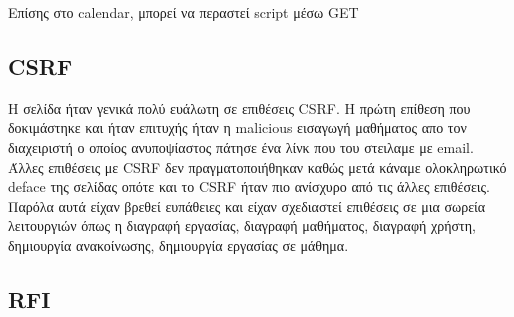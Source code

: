 \documentclass{article}
\begin{document}
Επίσης στο \textlatin{calendar}, μπορεί να περαστεί \textlatin{script} μέσω \textlatin{GET}

\subsection*{\textlatin{CSRF}}
Η σελίδα ήταν γενικά πολύ ευάλωτη σε επιθέσεις \textlatin{CSRF}. Η πρώτη
επίθεση που δοκιμάστηκε και ήταν επιτυχής ήταν η \textlatin{malicious} εισαγωγή
μαθήματος απο τον διαχειριστή ο οποίος ανυποψίαστος πάτησε ένα λίνκ που του στειλαμε με
\textlatin{email}. Άλλες επιθέσεις με \textlatin{CSRF} δεν πραγματοποιήθηκαν καθώς μετά
κάναμε ολοκληρωτικό \textlatin{deface} της σελίδας οπότε και το \textlatin{CSRF} ήταν πιο
ανίσχυρο από τις άλλες επιθέσεις. Παρόλα αυτά είχαν βρεθεί ευπάθειες και είχαν σχεδιαστεί
επιθέσεις σε μια σωρεία λειτουργιών όπως η διαγραφή εργασίας, διαγραφή μαθήματος, διαγραφή
χρήστη, δημιουργία ανακοίνωσης, δημιουργία εργασίας σε μάθημα.



\subsection*{\textlatin{RFI}}
\end{document}

